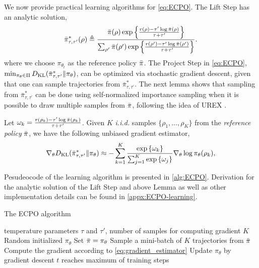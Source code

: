 We now provide practical learning algorithms for \cref{eq:ECPO}.
The Lift Step
has an analytic solution,
{\small
\begin{equation}
	\label{eq:pitautauprime}
	\bar{\pi}_{\tau,\tau^{\prime}}^*(\rho) \triangleq \frac{\bar{\pi}(\rho) \exp\left\{ \frac{r(\rho)-\tau^{\prime} \log \bar{\pi}(\rho) }{ \tau+\tau^{\prime}} \right\}}{ \sum_{\rho^{\prime}}{\bar{\pi}(\rho^{\prime}) \exp\left\{ \frac{r(\rho^{\prime})-\tau^{\prime} \log \bar{\pi}(\rho^{\prime})}{ \tau+\tau^{\prime}} \right\} } }.
\end{equation}
}	
 where we choose $\pi_{\theta_t}$ as the reference policy $\bar{\pi}$. The Project Step in \cref{eq:ECPO}, $\min\nolimits_{\pi_\theta \in \Pi}{D_{\mathrm{KL}}( \bar{\pi}_{\tau,\tau^{\prime}}^* \| \pi_\theta ) }$, can be optimized via stochastic gradient descent, given that one can sample trajectories from $\bar{\pi}_{\tau,\tau^{\prime}}^*$. %
The next lemma shows that sampling from $\bar{\pi}_{\tau,\tau^{\prime}}^*$ can be done using self-normalized importance sampling \citep{owen2013monte} when it is possible to draw multiple samples from $\bar{\pi}$, following the idea of UREX \citep{nachum2017improving}.   
\begin{lem}
\label{lem:ECPOgradientestimate}
Let $\omega_k = \frac{r(\rho_k) - \tau^{\prime} \log{\bar{\pi}(\rho_k)} }{\tau + \tau^{\prime}}$. Given $K$ \emph{i.i.d.} samples $\{\rho_1, \dots, \rho_K\}$ from the \emph{reference policy} $\bar{\pi}$, we have the following unbiased gradient estimator,
{\small
\begin{equation}
\label{eq:gradient_estimator}
	\nabla_{\theta} D_{\mathrm{KL}}(\bar{\pi}_{\tau,\tau^{\prime}}^* \| \pi_\theta)\approx -\sum\limits_{k=1}^K{ \frac{ \exp\left\{ \omega_k \right\} }{ \sum_{j=1}^K{ \exp\left\{ \omega_j \right\}}} \nabla_{\theta} \log{\pi_\theta(\rho_k)} },
\end{equation}
}
\end{lem}
Pesudeocode of the learning algorithm is presented in \cref{alg:ECPO}. Derivation for the analytic solution of the Lift Step and above Lemma as well as other implementation details can be found in \cref{appx:ECPO-learning}.

\begin{algorithm}[t]
	\caption{\label{alg:ECPO}  The ECPO algorithm}
	\begin{algorithmic}[1]
		\INPUT temperature parameters $\tau$ and $\tau'$, number of samples for computing gradient $K$
		\STATE Random initialized $\pi_{\theta}$
		\STATE Set $\bar{\pi} = \pi_\theta$
		\REPEAT 
		\STATE Sample a mini-batch of $K$ trajectories from $\bar{\pi}$
		\STATE Compute the gradient according to \cref{eq:gradient_estimator}
		\STATE Update $\pi_{\theta}$ by gradient descent
		\UNTIL $t$ reaches maximum of training steps
		\ENDFOR
	\end{algorithmic}
\end{algorithm}



